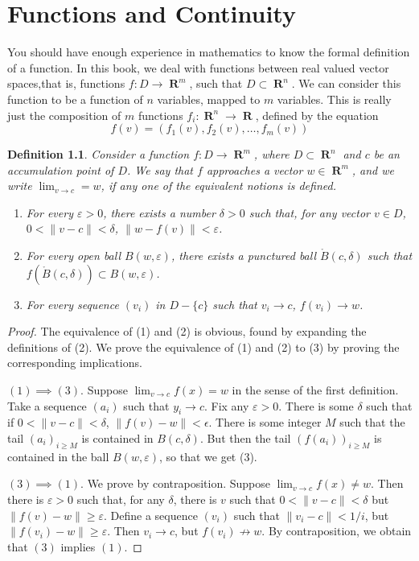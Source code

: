 \documentclass{report}
\newtheorem{definition}{Definition}
\DeclareMathOperator{\real}{\mathbf{R}}
\begin{document}
\chapter{Functions and Continuity}

You should have enough experience in mathematics to know the formal definition of a function. In this book, we deal with functions between real valued vector spaces,that is, functions $f:D \to \real^m$, such that $D \subset \real^n$. We can consider this function to be a function of $n$ variables, mapped to $m$ variables. This is really just the composition of $m$ functions $f_i:\real^n \to \real$, defined by the equation
%
\[ f(v) = (f_1(v), f_2(v), \dots, f_m(v)) \]

\begin{definition}
  Consider a function $f:D \to \real^m$, where $D \subset \real^n$ and $c$ be an accumulation point of $D$. We say that $f$ approaches a vector $w \in \real^m$, and we write $\lim_{v \to c} = w$, if any one of the equivalent notions is defined.

  \begin{enumerate}
    \item For every $\varepsilon > 0$, there exists a number $\delta > 0$ such that, for any vector $v \in D$, $0 < \|v - c\| < \delta$, $\|w - f(v)\| < \varepsilon$.
    \item For every open ball $B(w,\varepsilon)$, there exists a punctured ball $\mathring{B}(c,\delta)$ such that $f(\mathring{B}(c,\delta)) \subset B(w,\varepsilon)$.
    \item For every sequence $(v_i)$ in $D - \{ c \}$ such that $v_i \to c$, $f(v_i) \to w$.
  \end{enumerate}
\end{definition}
\begin{proof}
  The equivalence of (1) and (2) is obvious, found by expanding the definitions of (2). We prove the equivalence of (1) and (2) to (3) by proving the corresponding implications.

  $(1) \implies (3)$. Suppose $\lim_{v \to c} f(x) = w$ in the sense of the first definition. Take a sequence $(a_i)$ such that $y_i \to c$. Fix any $\varepsilon > 0$. There is some $\delta$ such that if $0 < \| v - c \| < \delta$, $\| f(v) - w \| < \epsilon$. There is some integer $M$ such that the tail $(a_i)_{i \geq M}$ is contained in $B(c,\delta)$. But then the tail $(f(a_i))_{i \geq M}$ is contained in the ball $B(w,\varepsilon)$, so that we get (3).

  $(3) \implies (1)$. We prove by contraposition. Suppose $\lim_{v \to c} f(x) \neq w$. Then there is $\varepsilon > 0$ such that, for any $\delta$, there is $v$ such that $0 < \|v - c\| < \delta$ but $\| f(v) - w \| \geq \varepsilon$. Define a sequence $(v_i)$ such that $\| v_i - c \| < 1/i$, but $\| f(v_i) - w \| \geq \varepsilon$. Then $v_i \to c$, but $f(v_i) \not \to w$. By contraposition, we obtain that $(3)$ implies $(1)$.
\end{proof}
\end{document}
